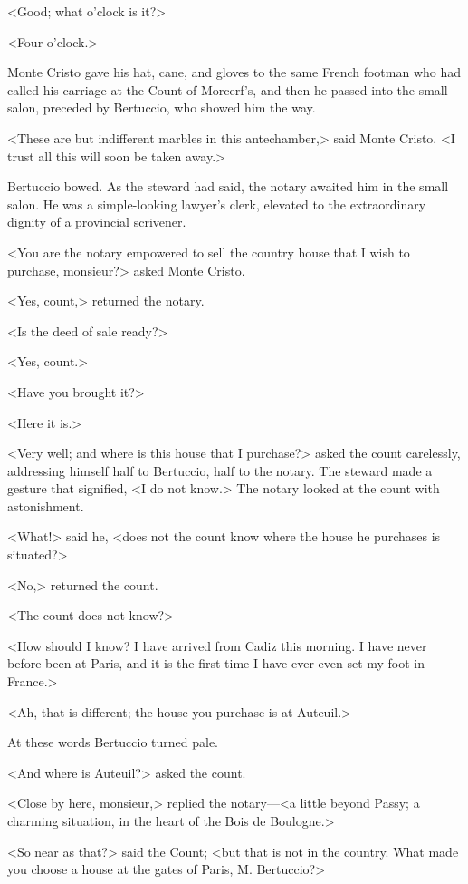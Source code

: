  <Good; what o'clock is it?> 

 <Four o'clock.> 

 Monte Cristo gave his hat, cane, and gloves to the same French footman who had called his carriage at the Count of Morcerf's, and then he passed into the small salon, preceded by Bertuccio, who showed him the way. 

 <These are but indifferent marbles in this antechamber,> said Monte Cristo. <I trust all this will soon be taken away.> 

 Bertuccio bowed. As the steward had said, the notary awaited him in the small salon. He was a simple-looking lawyer's clerk, elevated to the extraordinary dignity of a provincial scrivener. 

 <You are the notary empowered to sell the country house that I wish to purchase, monsieur?> asked Monte Cristo. 

 <Yes, count,> returned the notary. 

 <Is the deed of sale ready?> 

 <Yes, count.> 

 <Have you brought it?> 

 <Here it is.> 

 <Very well; and where is this house that I purchase?> asked the count carelessly, addressing himself half to Bertuccio, half to the notary. The steward made a gesture that signified, <I do not know.> The notary looked at the count with astonishment. 

 <What!> said he, <does not the count know where the house he purchases is situated?> 

 <No,> returned the count. 

 <The count does not know?> 

 <How should I know? I have arrived from Cadiz this morning. I have never before been at Paris, and it is the first time I have ever even set my foot in France.> 

 <Ah, that is different; the house you purchase is at Auteuil.> 

 At these words Bertuccio turned pale. 

 <And where is Auteuil?> asked the count. 

 <Close by here, monsieur,> replied the notary—<a little beyond Passy; a charming situation, in the heart of the Bois de Boulogne.> 

 <So near as that?> said the Count; <but that is not in the country. What made you choose a house at the gates of Paris, M. Bertuccio?> 

